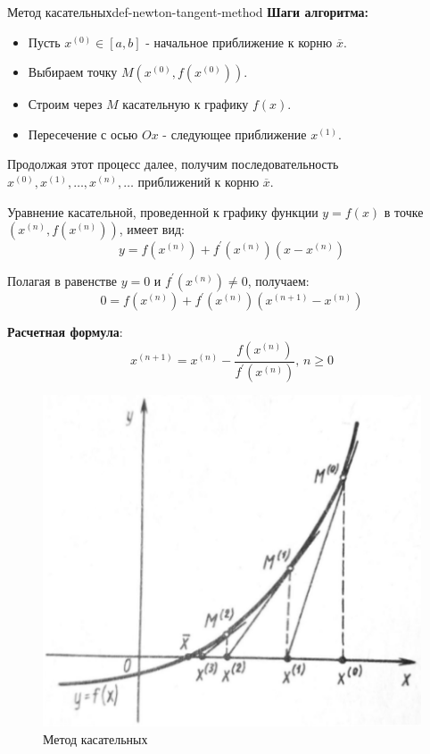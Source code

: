\documentclass[14pt]{extarticle}
\begin{document}
    \begin{definition}{Метод касательных}{def-newton-tangent-method}
        \textbf{Шаги алгоритма:}
        \begin{itemize}
            \item Пусть $x^{(0)} \in [a, b]$ - начальное приближение к корню $\overline{x}$.
            \item Выбираем точку $M(x^{(0)}, f(x^{(0)}))$.
            \item Строим через $M$ касательную к графику $f(x)$.
            \item Пересечение с осью $Ox$ - следующее приближение $x^{(1)}$.
        \end{itemize}
        Продолжая этот процесс далее, получим последовательность $x^{(0)}, x^{(1)}, \ldots, x^{(n)}, \ldots$ приближений к корню $\overline{x}$.
            
        \vspace{\baselineskip}

        Уравнение касательной, проведенной к графику функции $y = f(x)$ в точке $(x^{(n)}, f(x^{(n)}))$, имеет вид:
        $$y = f(x^{(n)}) + f^{'}(x^{(n)})(x - x^{(n)})$$

        Полагая в равенстве $y = 0$ и $f^{'}(x^{(n)}) \neq 0$, получаем:
        $$0 = f(x^{(n)}) + f^{'}(x^{(n)})(x^{(n + 1)} - x^{(n)})$$

        \textbf{Расчетная формула}:
        $$x^{(n + 1)} = x^{(n)} - \frac{f(x^{(n)})}{f^{'}(x^{(n)})} \text{, } n \geq 0$$
    \end{definition}

    \begin{figure}[H]
        \centering
        \includegraphics[scale=0.7]{images/newton-tangent-method-ex.png}
        \caption{Метод касательных}
        \label{fig:newton-tangent-method}
    \end{figure}
\end{document}
